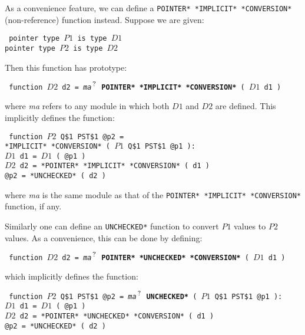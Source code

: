 \documentclass[12pt]{article}
\newcommand{\QMARK}{{$^{\,\mbox{\footnotesize ?}}$}}
\newcommand{\ttkey}[1]{{\tt \bfseries #1}}
\newenvironment{indpar}[1][0.3in]%
	{\begin{list}{}%
		     {\setlength{\itemsep}{0in}%
		      \setlength{\topsep}{0in}%
		      \setlength{\parsep}{1ex}%
		      \setlength{\labelwidth}{#1}%
		      \setlength{\leftmargin}{#1}%
		      \addtolength{\leftmargin}{\labelsep}}%
	 \item}%
	{\end{list}}
\begin{document}
As a convenience feature, we can define a
{\tt *POINTER* *IMPLICIT* *CONVERSION*} (non-reference) function instead.
 Suppose we are given:
\begin{indpar} \tt
pointer type $P1$ is type $D1$ \\
pointer type $P2$ is type $D2$
\end{indpar}
Then this function has prototype:
\begin{indpar}\label{POINTER-IMPLICIT-CONVERSION} \tt
function $D2$ d2 = {\em ma}\QMARK{} \ttkey{*POINTER* *IMPLICIT* *CONVERSION*}
                  ( $D1$ d1 )
\end{indpar}
where {\em ma} refers to any module in which both $D1$ and $D2$ are defined.
This implicitly defines the function:
\begin{indpar} \tt
function $P2$ Q\$1 PST\$1 @p2 = \\
\hspace*{1in}{\em ma}\QMARK{} *IMPLICIT* *CONVERSION*
			( $P1$ Q\$1 PST\$1 @p1 ): \\
\hspace*{0.3in}$D1$ d1 = $D1$ ( @p1 ) \\
\hspace*{0.3in}$D2$ d2 = *POINTER* *IMPLICIT* *CONVERSION* ( d1 ) \\
\hspace*{0.3in}@p2 = *UNCHECKED* ( d2 )
\end{indpar}
where {\em ma} is the same module as that of the
{\tt *POINTER* *IMPLICIT* *CONVERSION*} function, if any.

Similarly one can define an {\tt *UNCHECKED*} function to convert
$P1$ values to $P2$ values.  As a convenience, this can be
done by defining:
\begin{indpar} \tt
function $D2$ d2 = {\em ma}\QMARK{}  \ttkey{*POINTER* *UNCHECKED* *CONVERSION*}
			( $D1$ d1 )
\end{indpar}
which implicitly defines the function:
\begin{indpar} \tt
function $P2$ Q\$1 PST\$1 @p2 = {\em ma}\QMARK{} \ttkey{*UNCHECKED*}
	( $P1$ Q\$1 PST\$1 @p1 ): \\
\hspace*{0.3in}$D1$ d1 = $D1$ ( @p1 ) \\
\hspace*{0.3in}$D2$ d2 = *POINTER* *UNCHECKED* *CONVERSION* ( d1 ) \\
\hspace*{0.3in}@p2 = *UNCHECKED* ( d2 )
\end{indpar}
\end{document}
